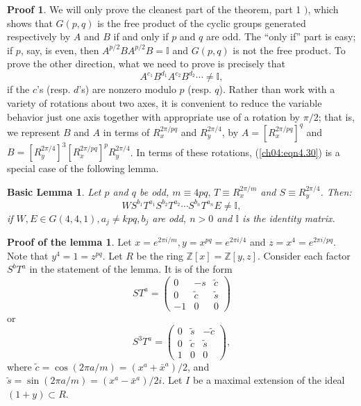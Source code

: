 \documentclass[reqno]{stml-l}
\theoremstyle{plain}
\newtheorem{lemmab}[theorem]{Basic Lemma}
\theoremstyle{definition}
\newtheorem*{proof*}{Proof}
\newtheorem*{proofl*}{Proof of the lemma}
\numberwithin{equation}{chapter}
\begin{document}
\begin{proof*}
We will only prove the cleanest part of the theorem, part 1 $)$, which shows that $G(p, q)$ is the free product of the cyclic groups generated respectively by $A$ and $B$ if and only if $p$ and $q$ are odd. The ``only if'' part is easy; if $p$, say, is even, then $A^{p/2}BA^{p/2}B=\mathbb{I}$ and $G(p, q)$ is not the free product. To prove the other direction, what we need to prove is precisely that
\begin{equation}\label{ch04:eqn4.30}
A^{c_{1}}B^{d_{1}}A^{c_{2}}B^{d_{2}}\cdots\neq \mathbb{I},
\end{equation}
if the $c$'s (resp. $d$'s) are nonzero modulo $p$ (resp. $q$). Rather than work with a variety of rotations about two axes, it is convenient to reduce the variable behavior just one axis together with appropriate use of a rotation by $\pi/2$; that is, we represent $B$ and $A$ in terms of $R_{x}^{2\pi/pq}$ and $R_{y}^{2\pi/4}$, by $A=[R_{x}^{2\pi/pq}]^{q}$ and $B=[R_{y}^{2\pi/4}]^{3}[R_{x}^{2\pi/pq}]^{p}R_{y}^{2\pi/4}$. In terms of these rotations, (\ref{ch04:eqn4.30}) is a special case of the following lemma.

\begin{lemmab}\label{ch04:lem4.8}
Let $p$ and $q$ be odd, $m\equiv 4pq,\,T\equiv R_{x}^{2\pi/m}$ and $S\equiv R_{y}^{2\pi/4}$. Then:
\begin{equation}\label{ch04:eqn4.31}
WS^{b_{1}}T^{a_{1}}S^{b_{2}}T^{a_{2}}\cdots S^{b_{n}}T^{a_{n}}E\neq \mathbb{I},
\end{equation}
if $W,E\in G(4,4,1),a_{j}\neq kpq,b_{j}$ are odd, $n>0$ and $\mathbb{I}$ is the identity matrix.
\end{lemmab}

\begin{proofl*}
Let $x=e^{2\pi i/m},y=x^{pq}=e^{2\pi i/4}$ and $z=x^{4}= e^{2\pi i/pq}$. Note that $y^{4}=1=z^{pq}$. Let $R$ be the ring $\mathbb{Z}[x]=\mathbb{Z}[y, z]$. Consider each factor $S^{b}T^{a}$ in the statement of the lemma. It is of the form
\begin{equation}\label{ch04:eqn4.32}
ST^{a}=\left(\begin{matrix}
0&-s&\tilde{c}\\
0&\tilde{c}&\tilde{s}\\
-1&0&0\end{matrix}\right)
\end{equation}
or
\begin{equation}\label{ch04:eqn4.33}
S^{3}T^{a}=\left(\begin{matrix}
0&\tilde{s}&-\tilde{c}\\
0&\tilde{c}&\tilde{s}\\
1&0&0\end{matrix}\right),
\end{equation}
where $\tilde{c}=\cos(2\pi a/m)=(x^{a}+\bar{x}^{a})/2$, and $\tilde{s}=\sin(2\pi a/m)= (x^{a}-\bar{x}^{a})/2i$. Let $I$ be a maximal extension of the ideal $(1+y)\subset R$.


\end{proofl*}
\end{proof*}
\end{document}
